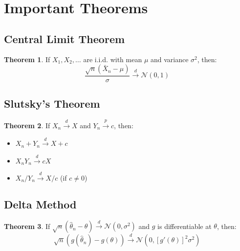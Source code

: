 \documentclass[11pt]{article}
\theoremstyle{definition}
\newtheorem{theorem}{Theorem}[section]
\begin{document}
\section{Important Theorems}

\subsection{Central Limit Theorem}
\begin{theorem}
If $X_1, X_2, \ldots$ are i.i.d. with mean $\mu$ and variance $\sigma^2$, then:
$$\frac{\sqrt{n}(\bar{X}_n - \mu)}{\sigma} \xrightarrow{d} \mathcal{N}(0,1)$$
\end{theorem}

\subsection{Slutsky's Theorem}
\begin{theorem}
If $X_n \xrightarrow{d} X$ and $Y_n \xrightarrow{p} c$, then:
\begin{itemize}
    \item $X_n + Y_n \xrightarrow{d} X + c$
    \item $X_n Y_n \xrightarrow{d} cX$
    \item $X_n / Y_n \xrightarrow{d} X / c$ (if $c \neq 0$)
\end{itemize}
\end{theorem}

\subsection{Delta Method}
\begin{theorem}
If $\sqrt{n}(\hat{\theta}_n - \theta) \xrightarrow{d} \mathcal{N}(0, \sigma^2)$ and $g$ is differentiable at $\theta$, then:
$$\sqrt{n}(g(\hat{\theta}_n) - g(\theta)) \xrightarrow{d} \mathcal{N}(0, [g'(\theta)]^2 \sigma^2)$$
\end{theorem}
\end{document}

